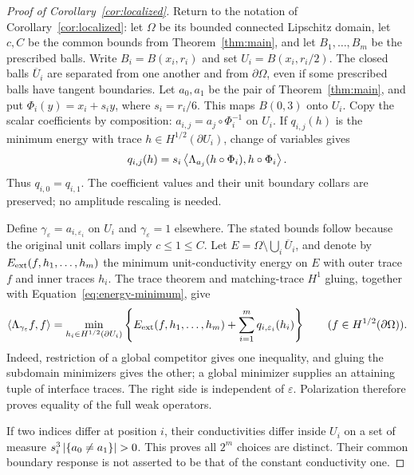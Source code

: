 \begin{proof}[Proof of Corollary~\ref{cor:localized}]
Return to the notation of Corollary~\ref{cor:localized}: let $\Omega$
be its bounded connected Lipschitz domain, let $c,C$ be the common bounds
from Theorem~\ref{thm:main}, and let $B_1,\ldots,B_m$ be the prescribed balls.
Write $B_i=B(x_i,r_i)$ and set $U_i=B(x_i,r_i/2)$.
The closed balls $\overline U_i$ are separated from one another and
from $\partial\Omega$, even if some prescribed balls have tangent
boundaries. Let $a_0,a_1$ be the pair of Theorem~\ref{thm:main},
and put $\Phi_i(y)=x_i+s_i y$, where $s_i=r_i/6$.
This maps $B(0,3)$ onto $U_i$. Copy the scalar coefficients by
composition: $a_{i,j}=a_j\circ\Phi_i^{-1}$ on $U_i$.
If $q_{i,j}(h)$ is the minimum energy with trace
$h\in H^{1/2}(\partial U_i)$, change of variables gives
\[
 q_{i,j}(h)=s_i
 \left\langle \Lambda_{a_j}(h\circ\Phi_i),h\circ\Phi_i\right\rangle.
\]
Thus $q_{i,0}=q_{i,1}$. The coefficient values and their unit
boundary collars are preserved; no amplitude rescaling is needed.

Define $\gamma_\varepsilon=a_{i,\varepsilon_i}$ on $U_i$ and
$\gamma_\varepsilon=1$ elsewhere. The stated bounds follow because
the original unit collars imply $c\leq1\leq C$.
Let $E=\Omega\setminus\bigcup_i\overline U_i$, and denote by
$E_{\rm ext}(f,h_1,\ldots,h_m)$ the minimum unit-conductivity
energy on $E$ with outer trace $f$ and inner traces $h_i$.
The trace theorem and matching-trace $H^1$ gluing, together with
Equation~\eqref{eq:energy-minimum}, give
\[
 \left\langle \Lambda_{\gamma_\varepsilon}f,f\right\rangle
 =\min_{h_i\in H^{1/2}(\partial U_i)}
 \left\{E_{\rm ext}(f,h_1,\ldots,h_m)
       +\sum_{i=1}^m q_{i,\varepsilon_i}(h_i)\right\}
 \qquad(f\in H^{1/2}(\partial\Omega)).
\]
Indeed, restriction of a global competitor gives one inequality,
and gluing the subdomain minimizers gives the other; a global
minimizer supplies an attaining tuple of interface traces.
The right side is independent of $\varepsilon$. Polarization
therefore proves equality of the full weak operators.

If two indices differ at position $i$, their conductivities differ
inside $U_i$ on a set of measure
$s_i^3\left\lvert \{a_0\ne a_1\}\right\rvert>0$. This proves all $2^m$ choices
are distinct. Their common boundary response is not asserted to be
that of the constant conductivity one.
\end{proof}
